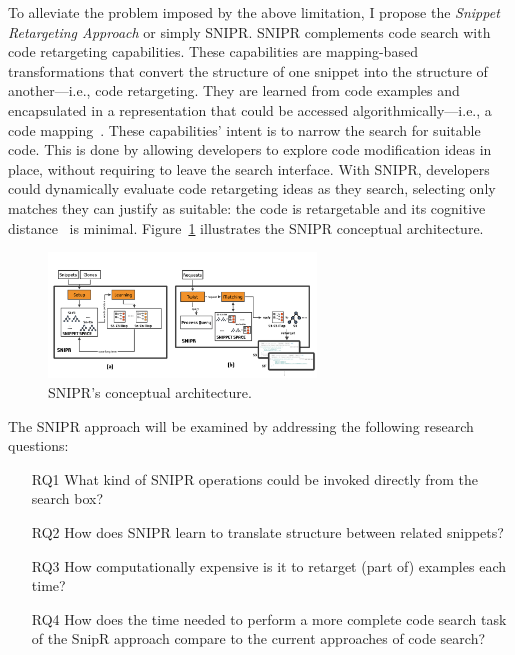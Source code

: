 \documentclass[conference]{IEEEtran}
\begin{document}
To alleviate the problem imposed by the above limitation, I propose the \emph{Snippet Retargeting Approach} or simply \uppercase{SnipR}. \uppercase{SnipR} complements code search with code retargeting capabilities. These capabilities are mapping-based transformations that convert the structure of one snippet into the structure of another---i.e., code retargeting. They are learned from code examples and encapsulated in a representation that could be accessed algorithmically---i.e., a code mapping~\cite{Nita:2010en}. These capabilities' intent is to narrow the search for suitable code. This is done by allowing developers to explore code modification ideas in place, without requiring to leave the search interface. With \uppercase{SNIPR}, developers could dynamically evaluate code retargeting ideas as they search, selecting only matches they can justify as suitable: the code is retargetable and its cognitive distance~\cite{Krueger:1992wf} is minimal. Figure~\ref{fig:architecture} illustrates the \uppercase{SnipR} conceptual architecture.

\begin{figure}[!t]
    \centering
    \includegraphics[width=2.8in]{images/SnippetRetargetingApproach}
    \caption{\uppercase{SnipR}'s conceptual architecture.}
    \label{fig:architecture}
\end{figure}

The \uppercase{SnipR} approach will be examined by addressing the following research questions:

\begin{itemize}  
\item[RQ1] What kind of \uppercase{SnipR} operations could be invoked directly from the search box?
\item[RQ2] How does \uppercase{SnipR} learn to translate structure between related snippets?
\item[RQ3] How computationally expensive is it to retarget (part of) examples each time?
\item[RQ4] How does the time needed to perform a more complete code search task of the SnipR approach compare to the current approaches of code search? 
\end{itemize}
\end{document}
